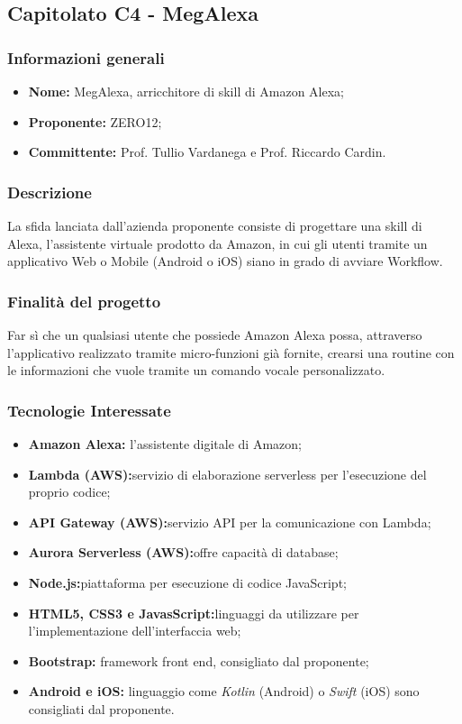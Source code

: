 \subsection{Capitolato C4 - MegAlexa}
\subsubsection{Informazioni generali}
\begin{itemize}
	\item \textbf{Nome: }MegAlexa, arricchitore di skill di Amazon Alexa;
	\item \textbf{Proponente: }ZERO12;
	\item \textbf{Committente: } Prof. Tullio Vardanega e Prof. Riccardo Cardin.
\end{itemize}
\subsubsection{Descrizione}
La sfida lanciata dall’azienda proponente consiste di progettare una skill di Alexa, l’assistente virtuale prodotto da 				Amazon, in cui gli utenti tramite un applicativo Web o Mobile (Android o iOS) siano in grado di avviare Workflow.
\subsubsection{Finalità del progetto}
Far sì che un qualsiasi utente che possiede Amazon Alexa possa, attraverso l’applicativo realizzato tramite micro-funzioni 			già fornite, crearsi una routine con le informazioni che vuole tramite un comando vocale personalizzato.
\subsubsection{Tecnologie Interessate}
\begin{itemize}
	\item \textbf{Amazon Alexa:} l'assistente digitale di Amazon;
	\item \textbf{Lambda (AWS):}servizio di elaborazione serverless per l'esecuzione del proprio codice; 
	\item \textbf{API Gateway (AWS):}servizio API per la comunicazione con Lambda;
	\item \textbf{Aurora Serverless (AWS):}offre capacità di database;
	\item \textbf{Node.js:}piattaforma per esecuzione di codice JavaScript;
	\item \textbf{HTML5, CSS3 e JavasScript:}linguaggi da utilizzare per l'implementazione dell'interfaccia web;
	\item \textbf{Bootstrap:} framework front end, consigliato dal proponente;
	\item \textbf{Android e iOS:} linguaggio come \textit{Kotlin} (Android) o \textit{Swift} (iOS) sono consigliati dal proponente.
\end{itemize}
